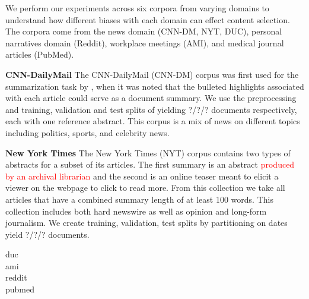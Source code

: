 We perform our experiments across six corpora from varying domains to 
understand how different biases with each domain can effect content 
selection. The corpora come from the news domain
(CNN-DM, NYT, DUC), personal narratives domain (Reddit),
workplace meetings (AMI), and medical journal articles (PubMed).

\textbf{CNN-DailyMail} The CNN-DailyMail (CNN-DM) corpus was first used 
for the summarization task by \cite{cl}, when it was noted that the bulleted
highlights associated with each article could serve as a document summary.
We use the preprocessing and training, validation and test splits
of \cite{see} yielding ?/?/? documents respectively, each with one reference
abstract. This corpus is a mix of news on different topics including politics,
sports, and celebrity news.

\textbf{New York Times} The New York Times (NYT) corpus \cite{nyt} contains
 two types of abstracts for a subset of its articles. The first summary is
an abstract \textcolor{red}{produced by an archival librarian} and the 
second is an online teaser meant to elicit a viewer on the webpage to
click to read more. From this collection we take all articles that have 
a combined summary length of at least 100 words. This collection
includes both hard newswire as well as opinion and long-form journalism.
We create training, validation, test splits by partitioning on dates
yield ?/?/? documents.






duc\\
ami \\
reddit \\
pubmed \\

